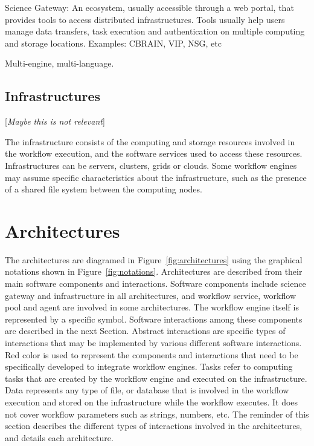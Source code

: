\documentclass[preprint,3p,twocolumn]{elsarticle}
\newcommand{\todo}[1]{\color{blue}\xspace[\emph{#1}]\xspace\color{black}}
\begin{document}
Science Gateway: An ecosystem, usually accessible through a web
  portal, that provides tools to access distributed
  infrastructures. Tools usually help users manage data transfers,
  task execution and authentication on multiple computing and storage
  locations. Examples: CBRAIN, VIP, NSG, etc

Multi-engine, multi-language.


\subsection{Infrastructures}

\todo{Maybe this is not relevant}

The infrastructure consists of the computing and storage resources
involved in the workflow execution, and the software services used to
access these resources. Infrastructures can be servers, clusters,
grids or clouds. Some workflow engines may assume specific
characteristics about the infrastructure, such as the presence of a
shared file system between the computing nodes.

\section{Architectures}

The architectures are diagramed in Figure~\ref{fig:architectures}
using the graphical notations shown in
Figure~\ref{fig:notations}. Architectures are described from their
main software components and interactions. Software components include
science gateway and infrastructure in all architectures, and workflow
service, workflow pool and agent are involved in some
architectures. The workflow engine itself is represented by a specific
symbol. Software interactions among these components are described in
the next Section. Abstract interactions are specific types of
interactions that may be implemented by various different software
interactions. Red color is used to represent the components and
interactions that need to be specifically developed to integrate
workflow engines. Tasks refer to computing tasks that are created by
the workflow engine and executed on the infrastructure. Data
represents any type of file, or database that is involved in the
workflow execution and stored on the infrastructure while the workflow
executes. It does not cover workflow parameters such as strings,
numbers, etc. The reminder of this section describes the different
types of interactions involved in the architectures, and details each
architecture.
\end{document}
